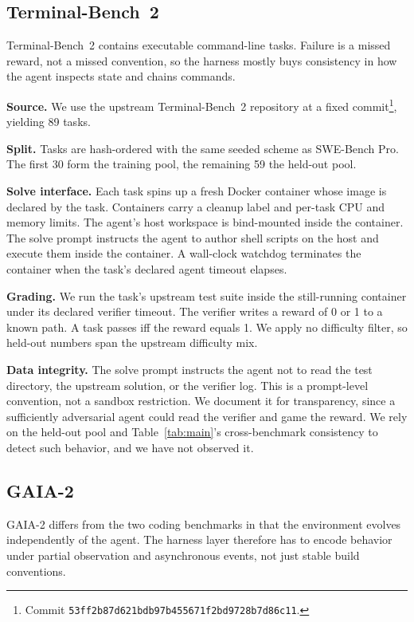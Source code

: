 \subsection{Terminal-Bench~2}

Terminal-Bench~2 \citep{terminalbench2} contains executable command-line tasks. Failure is a missed reward, not a missed convention, so the harness mostly buys consistency in how the agent inspects state and chains commands.

\noindent\textbf{Source.}
We use the upstream Terminal-Bench~2 repository at a fixed commit\footnote{Commit \texttt{53ff2b87d621bdb97b455671f2bd9728b7d86c11}.}, yielding 89 tasks.

\noindent\textbf{Split.}
Tasks are hash-ordered with the same seeded scheme as SWE-Bench Pro.
The first 30 form the training pool, the remaining 59 the held-out pool.

\noindent\textbf{Solve interface.}
Each task spins up a fresh Docker container whose image is declared by the task.
Containers carry a cleanup label and per-task CPU and memory limits.
The agent's host workspace is bind-mounted inside the container.
The solve prompt instructs the agent to author shell scripts on the host and execute them inside the container.
A wall-clock watchdog terminates the container when the task's declared agent timeout elapses.

\noindent\textbf{Grading.}
We run the task's upstream test suite inside the still-running container under its declared verifier timeout.
The verifier writes a reward of 0 or 1 to a known path.
A task passes iff the reward equals 1.
We apply no difficulty filter, so held-out numbers span the upstream difficulty mix.

\noindent\textbf{Data integrity.}
The solve prompt instructs the agent not to read the test directory, the upstream solution, or the verifier log.
This is a prompt-level convention, not a sandbox restriction.
We document it for transparency, since a sufficiently adversarial agent could read the verifier and game the reward.
We rely on the held-out pool and Table~\ref{tab:main}'s cross-benchmark consistency to detect such behavior, and we have not observed it.

\subsection{GAIA-2}

 GAIA-2 \citep{froger2026gaia2} differs from the two coding benchmarks in that the environment evolves independently of the agent.
The harness layer therefore has to encode behavior under partial observation and asynchronous events, not just stable build conventions.

